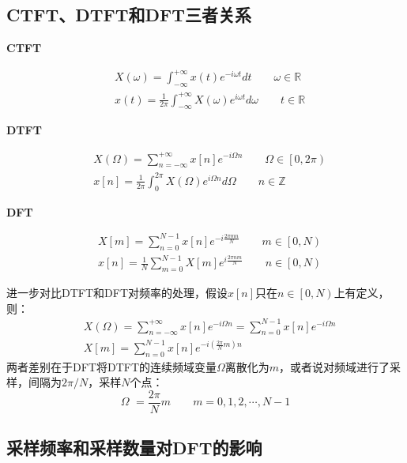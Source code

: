 \subsection{CTFT、DTFT和DFT三者关系}

{\bf CTFT}

\begin{align*}
&X\left( \omega \right) =\int_{-\infty}^{+\infty}{x\left( t \right) e^{-i\omega t}dt} \qquad \omega \in \mathbb{R} \\
&x\left( t \right) =\frac{1}{2\pi}\int_{-\infty}^{+\infty}{X\left( \omega \right) e^{i\omega t}d\omega} \qquad t\in \mathbb{R}
\end{align*}

{\bf DTFT}

\begin{align*}
&X\left( \varOmega \right) =\sum_{n=-\infty}^{+\infty}{x\left[ n \right] e^{-i\varOmega n}} \qquad \varOmega \in \left[ 0,2\pi \right) \\
&x\left[ n \right] =\frac{1}{2\pi}\int_0^{2\pi}{X\left( \varOmega \right) e^{i\varOmega n}d\varOmega} \qquad n\in \mathbb{Z}
\end{align*}

{\bf DFT}

\begin{align*}
&X\left[ m \right] =\sum_{n=0}^{N-1}{x\left[ n \right] e^{-i\frac{2\pi mn}{N}}} \qquad m\in \left[ 0,N \right) \\
&x\left[ n \right] =\frac{1}{N}\sum_{m=0}^{N-1}{X\left[ m \right] e^{i\frac{2\pi nm}{N}}} \qquad n\in \left[ 0,N \right)
\end{align*}

进一步对比DTFT和DFT对频率的处理，假设$x\left[ n \right] $只在$n\in \left[ 0,N \right) $上有定义，则：
\begin{align*}
&X\left( \varOmega \right) =\sum_{n=-\infty}^{+\infty}{x\left[ n \right] e^{-i\varOmega n}}=\sum_{n=0}^{N-1}{x\left[ n \right] e^{-i\varOmega n}} \\
&X\left[ m \right] =\sum_{n=0}^{N-1}{x\left[ n \right] e^{-i\left( \frac{2\pi}{N}m \right) n}}
\end{align*}
两者差别在于DFT将DTFT的连续频域变量$\varOmega $离散化为$m$，或者说对频域进行了采样，间隔为$2\pi /N$，采样$N$个点：
\[
\varOmega \,\,=\frac{2\pi}{N}m \qquad m=0,1,2,\cdots ,N-1
\]

\subsection{采样频率和采样数量对DFT的影响}

